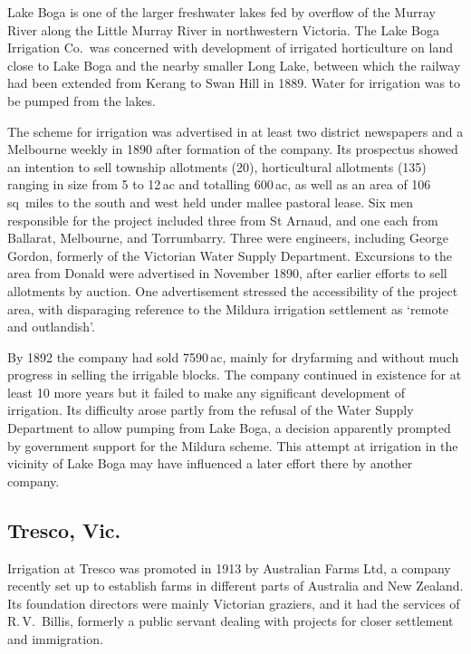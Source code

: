 Lake Boga is one of the larger freshwater lakes fed by overflow of the
Murray River along the Little Murray River in northwestern Victoria.
The Lake Boga Irrigation Co.\ was concerned with development of
irrigated horticulture on land close to Lake Boga and the nearby
smaller Long Lake, between which the railway had been extended from
Kerang to Swan Hill in 1889.  Water for irrigation was to be pumped
from the lakes.

The scheme for irrigation was advertised in at least two district
newspapers and a Melbourne weekly in 1890 after formation of the
company.  Its prospectus showed an intention to sell township
allotments (20), horticultural allotments (135) ranging in size from 5
to 12\,ac and totalling 600\,ac, as well as an area of 106\,sq~miles
to the south and west held under mallee pastoral lease.  Six men responsible for the project
included three from St Arnaud, and one each from Ballarat, Melbourne,
and Torrumbarry.  Three were engineers, including George Gordon,
formerly of the Victorian Water Supply Department.  Excursions to the
area from Donald were advertised in November 1890, after earlier
efforts to sell allotments by auction.  One advertisement stressed the
accessibility of the project area, with disparaging reference to the
Mildura irrigation settlement as `remote and outlandish'.

By 1892 the company had sold 7590\,ac, mainly for dryfarming and
without much progress in selling the irrigable blocks.  The company continued in existence for at
least 10 more years but it failed to make any significant development
of irrigation.  Its difficulty arose partly from the refusal of the
Water Supply Department to allow pumping from Lake Boga, a decision
apparently prompted by government support for the Mildura
scheme.  This attempt at irrigation in the vicinity of Lake Boga may
have influenced a later effort there by another company.

\subsection*{Tresco, Vic.}

Irrigation at Tresco was promoted in 1913 by Australian Farms Ltd, a
company recently set up to establish farms in different parts of
Australia and New Zealand.  Its foundation directors were mainly
Victorian graziers, and it had the services of R.\,V.~Billis, formerly
a public servant dealing with projects for closer settlement and
immigration.

